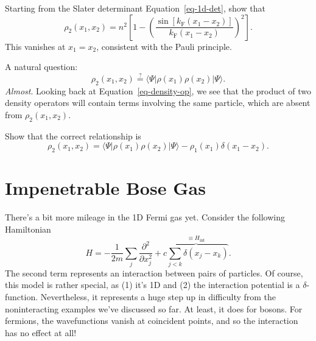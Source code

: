 \documentclass[
  letterpaper,
  DIV=11,
  numbers=noendperiod]{scrreprt}
\begin{document}
\begin{tcolorbox}[enhanced jigsaw, colback=white, bottomrule=.15mm, left=2mm, colbacktitle=quarto-callout-tip-color!10!white, breakable, colframe=quarto-callout-tip-color-frame, leftrule=.75mm, opacitybacktitle=0.6, opacityback=0, bottomtitle=1mm, toptitle=1mm, titlerule=0mm, title=\textcolor{quarto-callout-tip-color}{\faLightbulb}\hspace{0.5em}{Check}, toprule=.15mm, arc=.35mm, coltitle=black, rightrule=.15mm]

Starting from the Slater determinant Equation~\ref{eq-1d-det}, show that
\[
\rho_2(x_1,x_2) = n^2\left[1 - \left(\frac{\sin\left[k_\text{F}(x_1-x_2)\right]}{k_\text{F}(x_1-x_2)}\right)^2\right].
\] This vanishes at \(x_1=x_2\), consistent with the Pauli principle.

\end{tcolorbox}

A natural question: \[
\rho_2(x_1,x_2) \overset{?}{=} \langle{\Psi}\rvert\rho(x_1)\rho(x_2)\lvert{\Psi}\rangle.
\] \emph{Almost}. Looking back at Equation~\ref{eq-density-op}, we see
that the product of two density operators will contain terms involving
the same particle, which are absent from \(\rho_2(x_1,x_2)\).

\begin{tcolorbox}[enhanced jigsaw, colback=white, bottomrule=.15mm, left=2mm, colbacktitle=quarto-callout-tip-color!10!white, breakable, colframe=quarto-callout-tip-color-frame, leftrule=.75mm, opacitybacktitle=0.6, opacityback=0, bottomtitle=1mm, toptitle=1mm, titlerule=0mm, title=\textcolor{quarto-callout-tip-color}{\faLightbulb}\hspace{0.5em}{Check}, toprule=.15mm, arc=.35mm, coltitle=black, rightrule=.15mm]

Show that the correct relationship is \[
\rho_2(x_1,x_2) = \langle{\Psi}\rvert\rho(x_1)\rho(x_2)\lvert{\Psi}\rangle - \rho_1(x_1)\delta(x_1-x_2).
\]

\end{tcolorbox}

\section{Impenetrable Bose Gas}\label{impenetrable-bose-gas}

There's a bit more mileage in the 1D Fermi gas yet. Consider the
following Hamiltonian \[
H = -\frac{1}{2m}\sum_j \frac{\partial^2}{\partial x_j^2} + \overbrace{c\sum_{j<k}\delta(x_j-x_k)}^{\equiv H_\text{int}}.
\label{many_LL}
\] The second term represents an interaction between pairs of particles.
Of course, this model is rather special, as (1) it's 1D and (2) the
interaction potential is a \(\delta\)-function. Nevertheless, it
represents a huge step up in difficulty from the noninteracting examples
we've discussed so far. At least, it does for bosons. For fermions, the
wavefunctions vanish at coincident points, and so the interaction has no
effect at all!
\end{document}
